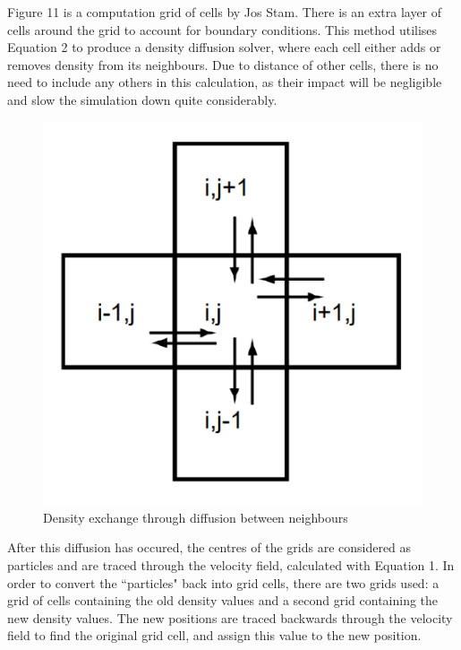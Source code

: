 \documentclass[12pt]{article}
\begin{document}
    Figure 11 is a computation grid of cells by Jos Stam. There is an extra layer of cells around the grid to account for boundary conditions. This method utilises Equation 2 to produce a density diffusion solver, where each cell either adds or removes density from its neighbours. Due to distance of other cells, there is no need to include any others in this calculation, as their impact will be negligible and slow the simulation down quite considerably.

    \begin{figure}[H]
        \begin{center}
            \includegraphics{neighbourDiff.png}
        \end{center}
        \caption{Density exchange through diffusion between neighbours \cite{stam}}   
    \end{figure}

    After this diffusion has occured, the centres of the grids are considered as particles and are traced through the velocity field, calculated with Equation 1. In order to convert the ``particles" back into grid cells, there are two grids used: a grid of cells containing the old density values and a second grid containing the new density values. The new positions are traced backwards through the velocity field to find the original grid cell, and assign this value to the new position.
\end{document}
